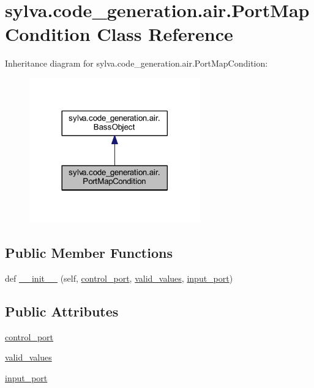 \hypertarget{classsylva_1_1code__generation_1_1air_1_1_port_map_condition}{}\section{sylva.\+code\+\_\+generation.\+air.\+Port\+Map\+Condition Class Reference}
\label{classsylva_1_1code__generation_1_1air_1_1_port_map_condition}


Inheritance diagram for sylva.\+code\+\_\+generation.\+air.\+Port\+Map\+Condition\+:\nopagebreak
\begin{figure}[H]
\begin{center}
\leavevmode
\includegraphics[width=209pt]{classsylva_1_1code__generation_1_1air_1_1_port_map_condition__inherit__graph}
\end{center}
\end{figure}
\subsection*{Public Member Functions}
\begin{DoxyCompactItemize}
\item 
def \hyperlink{classsylva_1_1code__generation_1_1air_1_1_port_map_condition_ae9d4fe40feaa0466075ab2ea74bdb7ce}{\+\_\+\+\_\+init\+\_\+\+\_\+} (self, \hyperlink{classsylva_1_1code__generation_1_1air_1_1_port_map_condition_a8144ca86c7e62e6bc09ab9b21322e146}{control\+\_\+port}, \hyperlink{classsylva_1_1code__generation_1_1air_1_1_port_map_condition_a98936107f0135352da9608e71fcdf69e}{valid\+\_\+values}, \hyperlink{classsylva_1_1code__generation_1_1air_1_1_port_map_condition_a88a75f6cca1f9c1db5bd699c6e82f191}{input\+\_\+port})
\end{DoxyCompactItemize}
\subsection*{Public Attributes}
\begin{DoxyCompactItemize}
\item 
\hyperlink{classsylva_1_1code__generation_1_1air_1_1_port_map_condition_a8144ca86c7e62e6bc09ab9b21322e146}{control\+\_\+port}
\item 
\hyperlink{classsylva_1_1code__generation_1_1air_1_1_port_map_condition_a98936107f0135352da9608e71fcdf69e}{valid\+\_\+values}
\item 
\hyperlink{classsylva_1_1code__generation_1_1air_1_1_port_map_condition_a88a75f6cca1f9c1db5bd699c6e82f191}{input\+\_\+port}
\end{DoxyCompactItemize}


